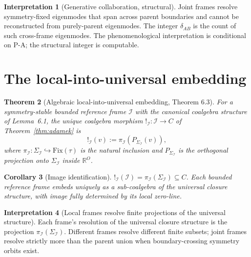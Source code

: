 \documentclass[11pt]{article}
\theoremstyle{plain}
\newtheorem{theorem}{Theorem}[section]
\newtheorem{corollary}[theorem]{Corollary}
\theoremstyle{definition}
\newtheorem{interpretation}[theorem]{Interpretation}
\theoremstyle{remark}
\newcommand{\Ical}{\mathcal{I}}
\newcommand{\Fix}{\mathrm{Fix}}
\begin{document}
\begin{interpretation}[Generative collaboration, structural]\label{int:generative-collaboration}
Joint frames resolve symmetry-fixed eigenmodes that span across parent boundaries and cannot be reconstructed from purely-parent eigenmodes. The integer $\delta_{AB}$ is the count of such cross-frame eigenmodes. The phenomenological interpretation is conditional on P-A; the structural integer is computable.
\end{interpretation}

\section{The local-into-universal embedding}\label{sec:embedding}

\begin{theorem}[Algebraic local-into-universal embedding, \citet{AlgebraicExistence} Theorem 6.3]\label{thm:embedding}
For a symmetry-stable bounded reference frame $\Ical$ with the canonical coalgebra structure of \citet{AlgebraicExistence} Lemma~6.1, the unique coalgebra morphism $!_\Ical: \Ical \to C$ of Theorem~\ref{thm:adamek} is
\begin{equation}\label{eq:embedding-formula}
  !_\Ical(v) := \pi_\Ical(P_{\Sigma_\Ical}(v)),
\end{equation}
where $\pi_\Ical: \Sigma_\Ical \hookrightarrow \Fix(\tau)$ is the natural inclusion and $P_{\Sigma_\Ical}$ is the orthogonal projection onto $\Sigma_\Ical$ inside $\mathbb{R}^O$.
\end{theorem}

\begin{corollary}[Image identification]\label{cor:image-id}
$!_\Ical(\Ical) = \pi_\Ical(\Sigma_\Ical) \subseteq C$. Each bounded reference frame embeds uniquely as a sub-coalgebra of the universal closure structure, with image fully determined by its local zero-line.
\end{corollary}

\begin{interpretation}[Local frames resolve finite projections of the universal structure]\label{int:local-into-universal}
Each frame's resolution of the universal closure structure is the projection $\pi_\Ical(\Sigma_\Ical)$. Different frames resolve different finite subsets; joint frames resolve strictly more than the parent union when boundary-crossing symmetry orbits exist.
\end{interpretation}
\end{document}
